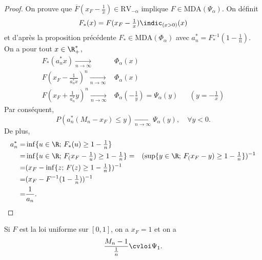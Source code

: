 \documentclass[10p,a4paper,reqno,titlepage]{report}
\begin{document}
\begin{proof}
	On prouve que $\overline{F} (x_F - \tfrac1x) \in \mathrm{RV}_{-\alpha}$ implique $F \in \mathrm{MDA}(\Psi_\alpha)$. On définit
	$$ F_\ast (x)= F(x_F - \tfrac1x) \indic_{(x>0)}(x)$$
	et d'après la proposition précédente $F_\ast \in \mathrm{MDA}(\Phi_\alpha)$ avec $a^* _n = F_\ast ^{-1} (1-\tfrac1n)$.\\
	On a pour tout $x\in\R_+ ^*$,
	\begin{align*}
		F_* (a_n ^* x ) \underset{n\to\infty}{\longrightarrow}&  \Phi_\alpha(x)\\
		F(x_F - \frac{1}{a_n ^* x }) ^n  \underset{n\to\infty}{\longrightarrow}&  \Phi_\alpha(x)\\
		F(x_F + \frac{1}{a_n ^* }y) ^n  \underset{n\to\infty}{\longrightarrow}&  \Phi_\alpha(-\frac1y )=\Psi_{\alpha}(y) && (y=-\frac{1}{x})
	\end{align*}
Par conséquent,
 $$ P(a_n^* (M_n - x_F) \leq y ) \underset{n\to\infty}{\longrightarrow} \Psi_{\alpha} (y),\quad\forall y < 0.$$
 De plus,
 \begin{align*}
 	a_n ^* = &  \inf \{u \in\R; \, F_* (u) \geq 1 -\tfrac1n \}\\
 	=&   \inf \{u \in\R; \, F_ (x_F -\tfrac1u ) \geq 1 -\tfrac1n \}
 	= & ( \sup \{y \in\R; \, F_ (x_F -y  ) \geq 1 -\tfrac1n \})^{-1} \\
 	=&  (x_F - \inf\{z; \, F(z) \geq 1 -\tfrac1n \})^{-1}\\
 	= & (x_F - F^{-1}(1-\tfrac1n ))^{-1}\\
 	= & \frac{1}{a_n}.
 \end{align*}
\end{proof}
\begin{ex}
	Si $F$ est la loi uniforme sur $[0,1]$, on a $x_F = 1 $ et on a
	$$ \frac{M_n - 1}{\tfrac1n }\cvloi \Psi_{1}.$$
\end{ex}
\end{document}
